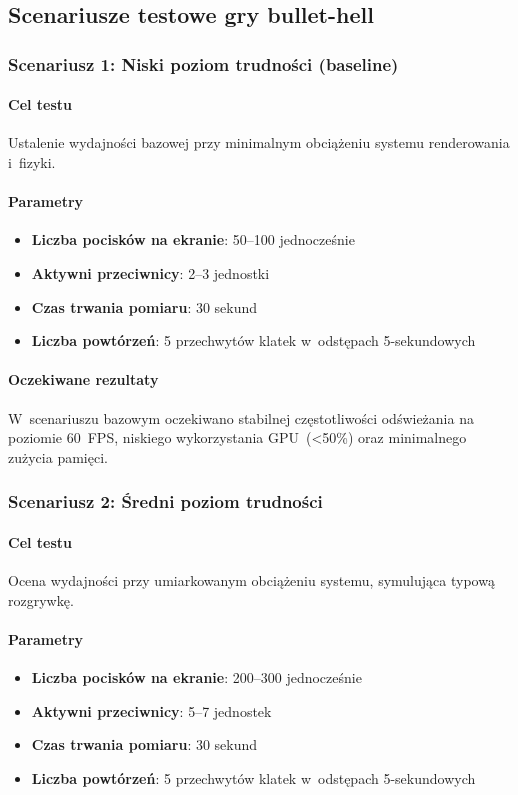 \subsection{Scenariusze testowe gry bullet-hell}

\subsubsection{Scenariusz 1: Niski poziom trudności (baseline)}

\paragraph{Cel testu}
Ustalenie wydajności bazowej przy minimalnym obciążeniu systemu renderowania i~fizyki.

\paragraph{Parametry}
\begin{itemize}
    \item \textbf{Liczba pocisków na ekranie}: 50--100 jednocześnie
    \item \textbf{Aktywni przeciwnicy}: 2--3 jednostki
    \item \textbf{Czas trwania pomiaru}: 30 sekund
    \item \textbf{Liczba powtórzeń}: 5 przechwytów klatek w~odstępach 5-sekundowych
\end{itemize}

\paragraph{Oczekiwane rezultaty}
W~scenariuszu bazowym oczekiwano stabilnej częstotliwości odświeżania na poziomie 60~FPS, niskiego wykorzystania GPU~(<50\%) oraz minimalnego zużycia pamięci.

\subsubsection{Scenariusz 2: Średni poziom trudności}

\paragraph{Cel testu}
Ocena wydajności przy umiarkowanym obciążeniu systemu, symulująca typową rozgrywkę.

\paragraph{Parametry}
\begin{itemize}
    \item \textbf{Liczba pocisków na ekranie}: 200--300 jednocześnie
    \item \textbf{Aktywni przeciwnicy}: 5--7 jednostek
    \item \textbf{Czas trwania pomiaru}: 30 sekund
    \item \textbf{Liczba powtórzeń}: 5 przechwytów klatek w~odstępach 5-sekundowych
\end{itemize}

